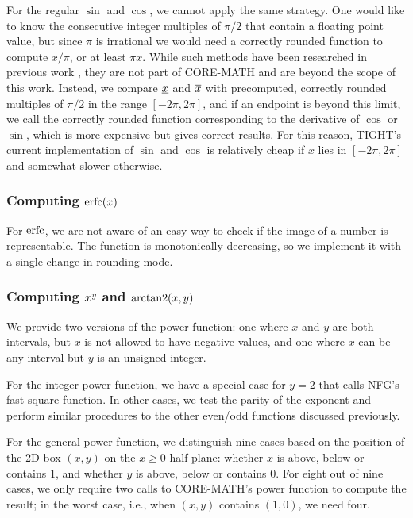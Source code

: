 For the regular $\sin$ and $\cos$, we cannot apply the same strategy. One would like to know the consecutive integer multiples of $\pi/2$ that contain a floating point value, but since $\pi$ is irrational we would need a correctly rounded function to compute $x/\pi$, or at least $\pi x$. 
While such methods have been researched in previous work \cite{Brisebarre:2005}, they are not part of CORE-MATH and are beyond the scope of this work.
Instead, we compare $\underline{x}$ and $\overline{x}$ with precomputed, correctly rounded multiples of $\pi/2$ in the range $[-2\pi, 2\pi]$, and if an endpoint is beyond this limit, we call the correctly rounded function corresponding to the derivative of $\cos$ or $\sin$, which is more expensive but gives correct results.
For this reason, TIGHT's current implementation of $\sin$ and $\cos$ is relatively cheap if $x$ lies in $[-2\pi, 2\pi]$ and somewhat slower otherwise.

\subsubsection{Computing $\operatorname{erfc}(x)$}
For $\operatorname{erfc}$, we are not aware of an easy way to check if the image of a number is representable. The function is monotonically decreasing, so we implement it with a single change in rounding mode.

\subsubsection{Computing $x^y$ and $\operatorname{arctan2}(x,y)$}
We provide two versions of the power function: one where $x$ and $y$ are both intervals, but $x$ is not allowed to have negative values, and one where $x$ can be any interval but $y$ is an unsigned integer.

For the integer power function, we have a special case for $y=2$ that calls NFG's fast square function. In other cases, we test the parity of the exponent and perform similar procedures to the other even/odd functions discussed previously.

For the general power function, we distinguish nine cases based on the position of the 2D box $(x,y)$ on the $x\geq0$ half-plane: whether $x$ is above, below or contains 1, and whether $y$ is above, below or contains 0.
For eight out of nine cases, we only require two calls to CORE-MATH's power function to compute the result; in the worst case, i.e., when $(x,y)$ contains $(1,0)$, we need four.

